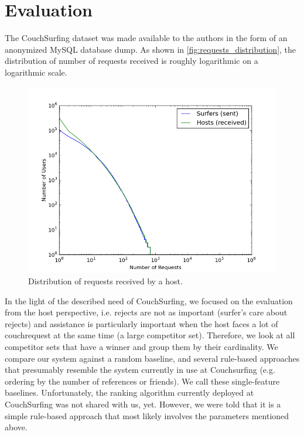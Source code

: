 \section{Evaluation} \label{sec:evaluation}

The CouchSurfing dataset was made available to the authors in the form of an anonymized MySQL database dump.
As shown in \autoref{fig:requests_distribution}, the distribution of number of requests received is roughly logarithmic on a logarithmic scale.

\begin{figure}[ht]
\centering
\includegraphics[width=1\linewidth]{figures/req_received_dist2.png}
\caption{Distribution of requests received by a host.}
\label{fig:requests_distribution}
\end{figure}

In the light of the described need of CouchSurfing, we focused on the evaluation from the host perspective, i.e. rejects are not as important (surfer's care about rejects) and assistance is particularly important when the host faces a lot of couchrequest at the same time (a large competitor set). Therefore, we look at all competitor sets that have a winner and group them by their cardinality. We compare our system against a random baseline, and several rule-based approaches that presumably resemble the system currently in use at Couchsurfing (e.g. ordering by the number of references or friends). We call these single-feature baselines. Unfortunately, the ranking algorithm currently deployed at CouchSurfing was not shared with us, yet. However, we were told that it is a simple rule-based approach that most likely involves the parameters mentioned above.

